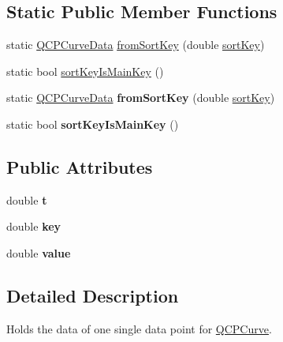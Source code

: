 \subsection*{Static Public Member Functions}
\begin{DoxyCompactItemize}
\item 
static \hyperlink{class_q_c_p_curve_data}{Q\+C\+P\+Curve\+Data} \hyperlink{class_q_c_p_curve_data_a40adf1a6ba93051c415a65298b49aa6e}{from\+Sort\+Key} (double \hyperlink{class_q_c_p_curve_data_a5a464c57c73904310db53fa3c6ff8361}{sort\+Key})
\item 
static bool \hyperlink{class_q_c_p_curve_data_a1b78f228e31ca40a1e69add44537918c}{sort\+Key\+Is\+Main\+Key} ()
\item 
static \hyperlink{class_q_c_p_curve_data}{Q\+C\+P\+Curve\+Data} {\bfseries from\+Sort\+Key} (double \hyperlink{class_q_c_p_curve_data_a5a464c57c73904310db53fa3c6ff8361}{sort\+Key})\hypertarget{class_q_c_p_curve_data_a40adf1a6ba93051c415a65298b49aa6e}{}\label{class_q_c_p_curve_data_a40adf1a6ba93051c415a65298b49aa6e}

\item 
static bool {\bfseries sort\+Key\+Is\+Main\+Key} ()\hypertarget{class_q_c_p_curve_data_a22bb516e31f7e4b28e314a1da20f2526}{}\label{class_q_c_p_curve_data_a22bb516e31f7e4b28e314a1da20f2526}

\end{DoxyCompactItemize}
\subsection*{Public Attributes}
\begin{DoxyCompactItemize}
\item 
double {\bfseries t}\hypertarget{class_q_c_p_curve_data_aecc395525be28e9178a088793beb3ff3}{}\label{class_q_c_p_curve_data_aecc395525be28e9178a088793beb3ff3}

\item 
double {\bfseries key}\hypertarget{class_q_c_p_curve_data_a8a4ec5f2b9a396149fd842e309701bd4}{}\label{class_q_c_p_curve_data_a8a4ec5f2b9a396149fd842e309701bd4}

\item 
double {\bfseries value}\hypertarget{class_q_c_p_curve_data_a72b39b8e1dbf7b45382ebd48419b6828}{}\label{class_q_c_p_curve_data_a72b39b8e1dbf7b45382ebd48419b6828}

\end{DoxyCompactItemize}


\subsection{Detailed Description}
Holds the data of one single data point for \hyperlink{class_q_c_p_curve}{Q\+C\+P\+Curve}. 

